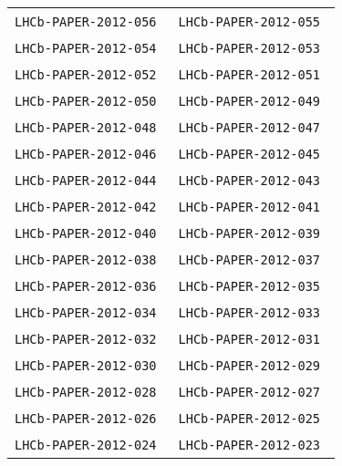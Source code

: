 \begin{center}
\begin{longtable}{ll}
\texttt{LHCb-PAPER-2012-056}~\cite{LHCb-PAPER-2012-056} & 
\texttt{LHCb-PAPER-2012-055}~\cite{LHCb-PAPER-2012-055} \\
\texttt{LHCb-PAPER-2012-054}~\cite{LHCb-PAPER-2012-054} & 
\texttt{LHCb-PAPER-2012-053}~\cite{LHCb-PAPER-2012-053} \\
\texttt{LHCb-PAPER-2012-052}~\cite{LHCb-PAPER-2012-052} & 
\texttt{LHCb-PAPER-2012-051}~\cite{LHCb-PAPER-2012-051} \\
\texttt{LHCb-PAPER-2012-050}~\cite{LHCb-PAPER-2012-050} & 
\texttt{LHCb-PAPER-2012-049}~\cite{LHCb-PAPER-2012-049} \\
\texttt{LHCb-PAPER-2012-048}~\cite{LHCb-PAPER-2012-048} & 
\texttt{LHCb-PAPER-2012-047}~\cite{LHCb-PAPER-2012-047} \\
\texttt{LHCb-PAPER-2012-046}~\cite{LHCb-PAPER-2012-046} & 
\texttt{LHCb-PAPER-2012-045}~\cite{LHCb-PAPER-2012-045} \\
\texttt{LHCb-PAPER-2012-044}~\cite{LHCb-PAPER-2012-044} & 
\texttt{LHCb-PAPER-2012-043}~\cite{LHCb-PAPER-2012-043} \\
\texttt{LHCb-PAPER-2012-042}~\cite{LHCb-PAPER-2012-042} & 
\texttt{LHCb-PAPER-2012-041}~\cite{LHCb-PAPER-2012-041} \\
\texttt{LHCb-PAPER-2012-040}~\cite{LHCb-PAPER-2012-040} & 
\texttt{LHCb-PAPER-2012-039}~\cite{LHCb-PAPER-2012-039} \\
\texttt{LHCb-PAPER-2012-038}~\cite{LHCb-PAPER-2012-038} & 
\texttt{LHCb-PAPER-2012-037}~\cite{LHCb-PAPER-2012-037} \\
\texttt{LHCb-PAPER-2012-036}~\cite{LHCb-PAPER-2012-036} & 
\texttt{LHCb-PAPER-2012-035}~\cite{LHCb-PAPER-2012-035} \\
\texttt{LHCb-PAPER-2012-034}~\cite{LHCb-PAPER-2012-034} & 
\texttt{LHCb-PAPER-2012-033}~\cite{LHCb-PAPER-2012-033} \\
\texttt{LHCb-PAPER-2012-032}~\cite{LHCb-PAPER-2012-032} & 
\texttt{LHCb-PAPER-2012-031}~\cite{LHCb-PAPER-2012-031} \\
\texttt{LHCb-PAPER-2012-030}~\cite{LHCb-PAPER-2012-030} & 
\texttt{LHCb-PAPER-2012-029}~\cite{LHCb-PAPER-2012-029} \\
\texttt{LHCb-PAPER-2012-028}~\cite{LHCb-PAPER-2012-028} & 
\texttt{LHCb-PAPER-2012-027}~\cite{LHCb-PAPER-2012-027} \\
\texttt{LHCb-PAPER-2012-026}~\cite{LHCb-PAPER-2012-026} & 
\texttt{LHCb-PAPER-2012-025}~\cite{LHCb-PAPER-2012-025} \\
\texttt{LHCb-PAPER-2012-024}~\cite{LHCb-PAPER-2012-024} & 
\texttt{LHCb-PAPER-2012-023}~\cite{LHCb-PAPER-2012-023} \\

\end{longtable}
\end{center}
